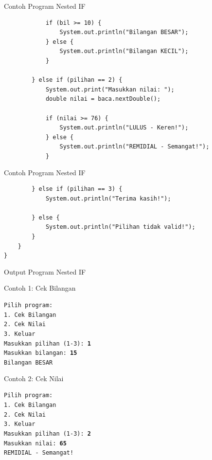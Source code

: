 \documentclass{beamer}
\begin{document}
\begin{frame}[fragile]{Contoh Program Nested IF}
\begin{lstlisting}
            if (bil >= 10) {
                System.out.println("Bilangan BESAR");
            } else {
                System.out.println("Bilangan KECIL");
            }
            
        } else if (pilihan == 2) {
            System.out.print("Masukkan nilai: ");
            double nilai = baca.nextDouble();
            
            if (nilai >= 76) {
                System.out.println("LULUS - Keren!");
            } else {
                System.out.println("REMIDIAL - Semangat!");
            }
\end{lstlisting}
\end{frame}

\begin{frame}[fragile]{Contoh Program Nested IF}
\begin{lstlisting} 
        } else if (pilihan == 3) {
            System.out.println("Terima kasih!");
            
        } else {
            System.out.println("Pilihan tidak valid!");
        }
    }
}
\end{lstlisting}
\end{frame}
\begin{frame}{Output Program Nested IF}
\begin{block}{Contoh 1: Cek Bilangan}
\colorbox{gray!20}{
    \parbox{0.9\textwidth}{
        \footnotesize\texttt{Pilih program:\\
        1. Cek Bilangan\\
        2. Cek Nilai\\
        3. Keluar\\
        Masukkan pilihan (1-3): \textbf{1}\\
        Masukkan bilangan: \textbf{15}\\
        Bilangan BESAR}
    }
}
\end{block}

\begin{block}{Contoh 2: Cek Nilai}
\colorbox{gray!20}{
    \parbox{0.9\textwidth}{
        \footnotesize\texttt{Pilih program:\\
        1. Cek Bilangan\\
        2. Cek Nilai\\
        3. Keluar\\
        Masukkan pilihan (1-3): \textbf{2}\\
        Masukkan nilai: \textbf{65}\\
        REMIDIAL - Semangat!}
    }
}
\end{block}
\end{frame}
\end{document}
